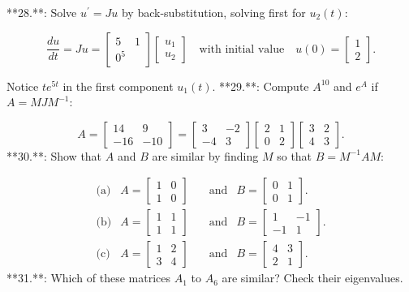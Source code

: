

**28.**: Solve \(u^{\prime}=Ju\) by back-substitution, solving first for \(u_{2}(t)\):

\[\frac{du}{dt}=Ju=\begin{bmatrix}5&1\\ 0^{5}&\end{bmatrix}\begin{bmatrix}u_{1}\\ u_{2}\end{bmatrix}\quad\text{with initial value}\quad u(0)=\begin{bmatrix}1\\ 2\end{bmatrix}.\]

Notice \(te^{5t}\) in the first component \(u_{1}(t)\).
**29.**: Compute \(A^{10}\) and \(e^{A}\) if \(A=MJM^{-1}\):

\[A=\begin{bmatrix}14&9\\ -16&-10\end{bmatrix}=\begin{bmatrix}3&-2\\ -4&3\end{bmatrix}\begin{bmatrix}2&1\\ 0&2\end{bmatrix}\begin{bmatrix}3&2\\ 4&3\end{bmatrix}.\]
**30.**: Show that \(A\) and \(B\) are similar by finding \(M\) so that \(B=M^{-1}AM\):

\[\begin{array}{ll}\text{(a)}&A=\begin{bmatrix}1&0\\ 1&0\end{bmatrix}&\quad\text{and}&B=\begin{bmatrix}0&1\\ 0&1\end{bmatrix}.\\ \text{(b)}&A=\begin{bmatrix}1&1\\ 1&1\end{bmatrix}&\quad\text{and}&B=\begin{bmatrix}1&-1\\ -1&1\end{bmatrix}.\\ \text{(c)}&A=\begin{bmatrix}1&2\\ 3&4\end{bmatrix}&\quad\text{and}&B=\begin{bmatrix}4&3\\ 2&1\end{bmatrix}.\end{array}\]
**31.**: Which of these matrices \(A_{1}\) to \(A_{6}\) are similar? Check their eigenvalues.

